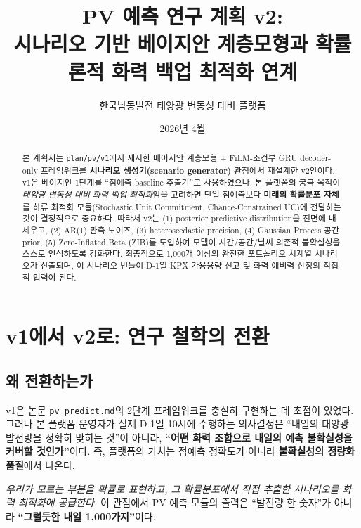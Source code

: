 \documentclass[11pt,a4paper]{article}
\title{PV 예측 연구 계획 v2:\\
시나리오 기반 베이지안 계층모형과 확률론적 화력 백업 최적화 연계}
\author{한국남동발전 태양광 변동성 대비 플랫폼}
\date{2026년 4월}
\begin{document}
\maketitle

\begin{abstract}
본 계획서는 \texttt{plan/pv/v1}에서 제시한 베이지안 계층모형 + FiLM-조건부 GRU decoder-only 프레임워크를 \textbf{시나리오 생성기(scenario generator)} 관점에서 재설계한 v2안이다. v1은 베이지안 1단계를 ``점예측 baseline 추출기''로 사용하였으나, 본 플랫폼의 궁극 목적이 \textit{태양광 변동성 대비 화력 백업 최적화}임을 고려하면 단일 점예측보다 \textbf{미래의 확률분포 자체}를 하류 최적화 모듈(Stochastic Unit Commitment, Chance-Constrained UC)에 전달하는 것이 결정적으로 중요하다. 따라서 v2는 (1) posterior predictive distribution을 전면에 내세우고, (2) AR(1) 관측 노이즈, (3) heteroscedastic precision, (4) Gaussian Process 공간 prior, (5) Zero-Inflated Beta (ZIB)를 도입하여 모델이 시간/공간/날씨 의존적 불확실성을 스스로 인식하도록 강화한다. 최종적으로 1,000개 이상의 완전한 포트폴리오 시계열 시나리오가 산출되며, 이 시나리오 번들이 D-1일 KPX 가용용량 신고 및 화력 예비력 산정의 직접적 입력이 된다.
\end{abstract}

\tableofcontents
\newpage

\section{v1에서 v2로: 연구 철학의 전환}

\subsection{왜 전환하는가}

v1은 논문 \texttt{pv\_predict.md}의 2단계 프레임워크를 충실히 구현하는 데 초점이 있었다. 그러나 본 플랫폼 운영자가 실제 D-1일 10시에 수행하는 의사결정은 ``내일의 태양광 발전량을 정확히 맞히는 것''이 아니라, \textbf{``어떤 화력 조합으로 내일의 예측 불확실성을 커버할 것인가''}이다. 즉, 플랫폼의 가치는 점예측 정확도가 아니라 \textbf{불확실성의 정량화 품질}에서 나온다.

\begin{keybox}[핵심 재정의]
\textit{우리가 모르는 부분을 확률로 표현하고, 그 확률분포에서 직접 추출한 시나리오를 화력 최적화에 공급한다.} 이 관점에서 PV 예측 모듈의 출력은 ``발전량 한 숫자''가 아니라 \textbf{``그럴듯한 내일 1,000가지''}이다.
\end{keybox}
\end{document}
